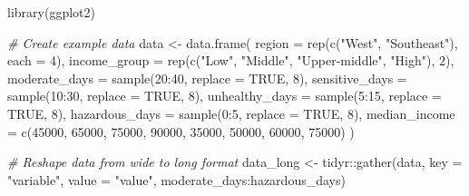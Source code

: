 \documentclass[
]{article}
\newenvironment{Shaded}{\begin{snugshade}}{\end{snugshade}}
\newcommand{\AttributeTok}[1]{\textcolor[rgb]{0.77,0.63,0.00}{#1}}
\newcommand{\CommentTok}[1]{\textcolor[rgb]{0.56,0.35,0.01}{\textit{#1}}}
\newcommand{\ConstantTok}[1]{\textcolor[rgb]{0.00,0.00,0.00}{#1}}
\newcommand{\DecValTok}[1]{\textcolor[rgb]{0.00,0.00,0.81}{#1}}
\newcommand{\FunctionTok}[1]{\textcolor[rgb]{0.00,0.00,0.00}{#1}}
\newcommand{\NormalTok}[1]{#1}
\newcommand{\OtherTok}[1]{\textcolor[rgb]{0.56,0.35,0.01}{#1}}
\newcommand{\SpecialCharTok}[1]{\textcolor[rgb]{0.00,0.00,0.00}{#1}}
\newcommand{\StringTok}[1]{\textcolor[rgb]{0.31,0.60,0.02}{#1}}
\begin{document}
\begin{Shaded}
\begin{Highlighting}[]
\FunctionTok{library}\NormalTok{(ggplot2)}

\CommentTok{\# Create example data}
\NormalTok{data }\OtherTok{\textless{}{-}} \FunctionTok{data.frame}\NormalTok{(}
  \AttributeTok{region =} \FunctionTok{rep}\NormalTok{(}\FunctionTok{c}\NormalTok{(}\StringTok{"West"}\NormalTok{, }\StringTok{"Southeast"}\NormalTok{), }\AttributeTok{each =} \DecValTok{4}\NormalTok{),}
  \AttributeTok{income\_group =} \FunctionTok{rep}\NormalTok{(}\FunctionTok{c}\NormalTok{(}\StringTok{"Low"}\NormalTok{, }\StringTok{"Middle"}\NormalTok{, }\StringTok{"Upper{-}middle"}\NormalTok{, }\StringTok{"High"}\NormalTok{), }\DecValTok{2}\NormalTok{),}
  \AttributeTok{moderate\_days =} \FunctionTok{sample}\NormalTok{(}\DecValTok{20}\SpecialCharTok{:}\DecValTok{40}\NormalTok{, }\AttributeTok{replace =} \ConstantTok{TRUE}\NormalTok{, }\DecValTok{8}\NormalTok{),}
  \AttributeTok{sensitive\_days =} \FunctionTok{sample}\NormalTok{(}\DecValTok{10}\SpecialCharTok{:}\DecValTok{30}\NormalTok{, }\AttributeTok{replace =} \ConstantTok{TRUE}\NormalTok{, }\DecValTok{8}\NormalTok{),}
  \AttributeTok{unhealthy\_days =} \FunctionTok{sample}\NormalTok{(}\DecValTok{5}\SpecialCharTok{:}\DecValTok{15}\NormalTok{, }\AttributeTok{replace =} \ConstantTok{TRUE}\NormalTok{, }\DecValTok{8}\NormalTok{),}
  \AttributeTok{hazardous\_days =} \FunctionTok{sample}\NormalTok{(}\DecValTok{0}\SpecialCharTok{:}\DecValTok{5}\NormalTok{, }\AttributeTok{replace =} \ConstantTok{TRUE}\NormalTok{, }\DecValTok{8}\NormalTok{),}
  \AttributeTok{median\_income =} \FunctionTok{c}\NormalTok{(}\DecValTok{45000}\NormalTok{, }\DecValTok{65000}\NormalTok{, }\DecValTok{75000}\NormalTok{, }\DecValTok{90000}\NormalTok{, }\DecValTok{35000}\NormalTok{, }\DecValTok{50000}\NormalTok{, }\DecValTok{60000}\NormalTok{, }\DecValTok{75000}\NormalTok{)}
\NormalTok{)}

\CommentTok{\# Reshape data from wide to long format}
\NormalTok{data\_long }\OtherTok{\textless{}{-}}\NormalTok{ tidyr}\SpecialCharTok{::}\FunctionTok{gather}\NormalTok{(data, }\AttributeTok{key =} \StringTok{"variable"}\NormalTok{, }\AttributeTok{value =} \StringTok{"value"}\NormalTok{, moderate\_days}\SpecialCharTok{:}\NormalTok{hazardous\_days)}


\end{Highlighting}
\end{Shaded}
\end{document}
